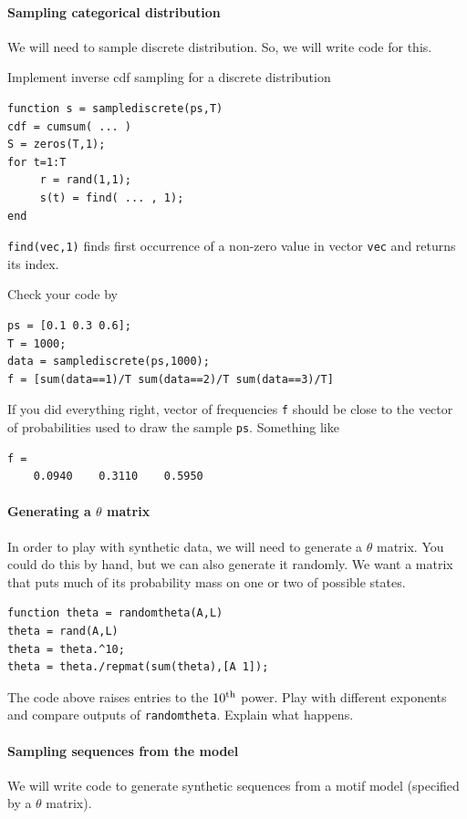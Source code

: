 \documentclass{article}
\begin{document}
{\paragraph{Sampling categorical distribution} We will need to sample discrete distribution. So, we will
write code for this.

Implement inverse cdf sampling for a discrete distribution
\begin{verbatim}
function s = samplediscrete(ps,T)
cdf = cumsum( ... )
S = zeros(T,1);
for t=1:T
     r = rand(1,1);
     s(t) = find( ... , 1);
end
\end{verbatim}

\verb|find(vec,1)| finds first occurrence of a non-zero value in vector \verb|vec| and returns its index.


Check your code by 
\begin{verbatim}
ps = [0.1 0.3 0.6];
T = 1000;
data = samplediscrete(ps,1000);
f = [sum(data==1)/T sum(data==2)/T sum(data==3)/T]
\end{verbatim}
If you did everything right, vector of frequencies \verb|f| should be close to the vector of probabilities used
to draw the sample \verb|ps|. Something like
\begin{verbatim}
f =
    0.0940    0.3110    0.5950
\end{verbatim}

\paragraph{Generating a $\theta$ matrix} In order to play with synthetic data, we will need
to generate a $\theta$ matrix. You could do this by hand, but we can also generate it randomly.
We want a matrix that puts much of its probability mass on one or two of possible states. 

\begin{verbatim}
function theta = randomtheta(A,L)
theta = rand(A,L)
theta = theta.^10;
theta = theta./repmat(sum(theta),[A 1]);
\end{verbatim}

The code above raises entries to the $10^{{\textrm{th}}}$ power.
Play with different exponents and compare outputs of \verb|randomtheta|.
Explain what happens. \answer

\paragraph{Sampling sequences from the model}
We will write code to generate synthetic sequences from a motif model (specified by a $\theta$ matrix).

}
\end{document}
